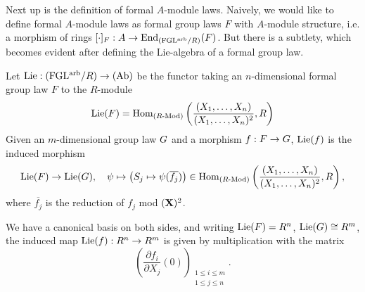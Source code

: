 \documentclass[../main.tex]{subfiles}
\begin{document}
Next up is the definition of formal $A$-module laws. Naively, we would like to 
define formal $A$-module laws as formal group laws $F$
with $A$-module structure, i.e. a morphism of rings $[\cdot]_F: A \to
\operatorname{End}_{(\mathrm{FGL^{arb}}/{R})}(F)$. But there is a subtlety, which becomes evident after defining
the Lie-algebra of a formal group law. 
\begin{defi}
Let $\operatorname{Lie}: {(\mathrm{FGL^{arb}}/{R})} \to {(\mathrm{Ab})}$ be the functor taking an $n$-dimensional 
formal group law $F$ to the $R$-module
\begin{equation*}
  \operatorname{Lie}({F}) = \operatorname{Hom}_{{({R}\text-\allowbreak\mathrm{Mod})}} \left( \frac{(X_1, \dots, X_n)}{(X_1, \dots,
  X_n)^2}, R \right) 
\end{equation*}
Given an $m$-dimensional group law ${G}$ and a morphism ${f}: {F} \to
{G}$, $\operatorname{Lie}({f})$ is the induced morphism
\begin{equation*}
  \operatorname{Lie}({F}) \to \operatorname{Lie}({G}), \quad \psi \mapsto \left( S_j \mapsto \psi
  (\overline{f_j})\right) \in 
  \operatorname{Hom}_{({R}\text-\allowbreak\mathrm{Mod})}\left(\frac{(X_1, \dots, X_n)}{(X_1, \dots, X_n)^2}, R \right),
\end{equation*}
where $\overline{ f_j}$ is the reduction of $f_j$ mod $(\mathbf{X})^2$. 
\end{defi}
We have a canonical basis on both sides, and writing $\operatorname{Lie}({F}) = R^n$, 
$\operatorname{Lie}({G}) \cong R^m$, the induced map $\operatorname{Lie}({f}) : R^n \to R^m$ is
given by multiplication with the matrix 
\begin{equation*}
  \left( \frac {\partial f_i}{\partial X_j} (0) \right)_{\substack{1 \leq i \leq m \\ 1 \leq j \leq n}}.
\end{equation*}
\end{document}
